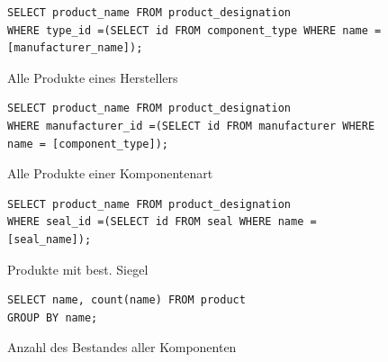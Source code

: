 \documentclass{article}
\begin{document}
\begin{figure}[!h]
\caption{Alle Produkte eines Herstellers}
\begin{lstlisting}
SELECT product_name FROM product_designation
WHERE type_id =(SELECT id FROM component_type WHERE name = [manufacturer_name]);
\end{lstlisting}
\end{figure}
\begin{figure}[!h]
\caption{Alle Produkte einer Komponentenart}
\begin{lstlisting}
SELECT product_name FROM product_designation
WHERE manufacturer_id =(SELECT id FROM manufacturer WHERE name = [component_type]);
\end{lstlisting}
\end{figure}
\begin{figure}[!h]
\caption{Produkte mit best. Siegel}
\begin{lstlisting}
SELECT product_name FROM product_designation
WHERE seal_id =(SELECT id FROM seal WHERE name = [seal_name]);
\end{lstlisting}
\end{figure}
\begin{figure}[!h]
\caption{Anzahl des Bestandes aller Komponenten}
\begin{lstlisting}
SELECT name, count(name) FROM product 
GROUP BY name;
\end{lstlisting}
\end{figure}
\newpage
\end{document}
